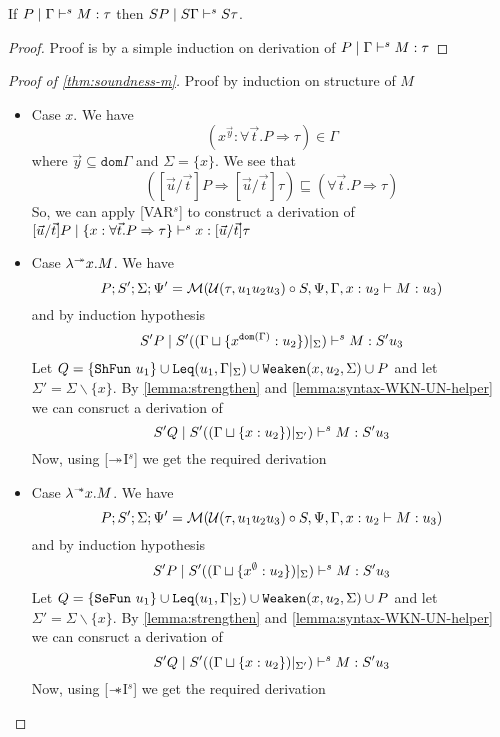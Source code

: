 \begin{lemma}\label{lemma:syntax-closed-under-sub}
  If $P \mid \Gamma \vdash^s M:\tau$ then $S P \mid S \Gamma \vdash^s S \tau$.
\end{lemma}
\begin{proof}
  Proof is by a simple induction on derivation of $P \mid \Gamma \vdash^s M:\tau$
\end{proof}

\begin{proof}[Proof of \cref{thm:soundness-m}]
  Proof by induction on structure of $M$
  \begin{itemize}
  \item{Case $x$.}
    We have $$(x^{\vec{y}}:\forall \vec{t}. P \Rightarrow \tau) \in \Gamma$$ where $\vec{y} \subseteq \texttt{dom}{\Gamma}$ and $\Sigma = \{ x \}$. We see that
    $$([\vec{u}/\vec{t}]P \Rightarrow [\vec{u}/\vec{t}]\tau) \sqsubseteq (\forall \vec{t}. P \Rightarrow \tau)$$
    So, we can apply [VAR$^s$] to construct a derivation of
    $[\vec{u}/\vec{t}]P \mid \{x:\forall \vec{t}. P \Rightarrow \tau \} \vdash^s x: [\vec{u}/\vec{t}]\tau$

  \item{Case $\lambda^{\twoheadrightarrow} x. M$.}
    We have $$P; S'; \Sigma; \Psi' = \mathcal{M}(\mathcal{U}(\tau, u_1 u_2 u_3) \circ S, \Psi, \Gamma, x:u_2 \vdash M: u_3)$$
    and by induction hypothesis $$S' P \mid S' ((\Gamma \sqcup \{ x^{\texttt{dom}(\Gamma)} : u_2 \})|_{\Sigma}) \vdash^s M : S' u_3$$
    Let $Q = \{\texttt{ShFun}\ u_1\} \cup \texttt{Leq}(u_1, \Gamma|_\Sigma) \cup \texttt{Weaken}(x, u_2, \Sigma) \cup P$
    and let $\Sigma' = \Sigma \backslash \{x\}$. By \cref{lemma:strengthen} and \cref{lemma:syntax-WKN-UN-helper} we can consruct a
    derivation of $$S' Q \mid S'  ((\Gamma \sqcup \{x:u_2\})|_{\Sigma'}) \vdash^s M: S' u_3$$
    Now, using [$\twoheadrightarrow$I$^s$] we get the required derivation

  \item{Case $\lambda^{\mathrel{-\mkern-6mu*}} x. M$.}
    We have $$P; S'; \Sigma; \Psi' = \mathcal{M}(\mathcal{U}(\tau, u_1 u_2 u_3) \circ S, \Psi, \Gamma, x:u_2 \vdash M: u_3)$$
    and by induction hypothesis $$S' P \mid S' ((\Gamma \sqcup \{ x^\emptyset : u_2 \})|_{\Sigma}) \vdash^s M : S' u_3$$
    Let $Q = \{\texttt{SeFun}\ u_1\} \cup \texttt{Leq}(u_1, \Gamma|_\Sigma) \cup \texttt{Weaken}(x, u_2, \Sigma) \cup P$
    and let $\Sigma' = \Sigma \backslash \{x\}$. By \cref{lemma:strengthen} and \cref{lemma:syntax-WKN-UN-helper} we can consruct a
    derivation of $$S' Q \mid S'  ((\Gamma \sqcup \{x:u_2\})|_{\Sigma'}) \vdash^s M: S' u_3$$
    Now, using [$\mathrel{-\mkern-6mu*}$I$^s$] we get the required derivation


\end{itemize}
\end{proof}
